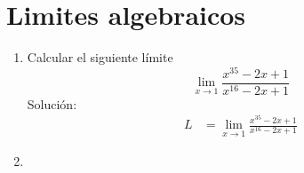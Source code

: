 \section{Limites algebraicos}
\begin{enumerate}
    \item Calcular el siguiente límite
    \[\lim_{x\to 1}\frac{x^{35}-2x+1}{x^{16}-2x+1}\]
    Solución:
    \begin{align*}
        L&=\lim_{x \to 1}\frac{x^{35}-2x+1}{x^{16}-2x+1}
        
    \end{align*}
    \item 
\end{enumerate}
